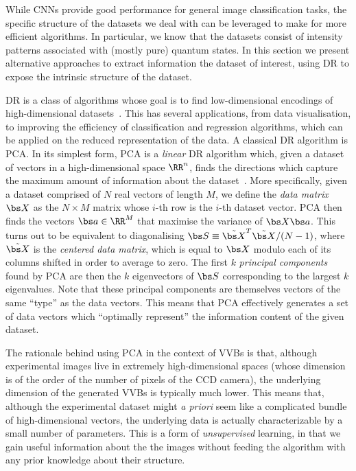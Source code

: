 While CNNs provide good performance for general image classification tasks, the specific structure of the datasets we deal with can be leveraged to make for more efficient algorithms. In particular, we know that the datasets consist of intensity patterns associated with (mostly pure) quantum states.
In this section we present alternative approaches to extract information the dataset of interest, using \ac{DR} to expose the intrinsic structure of the dataset.


\acf{DR} is a class of algorithms whose goal is to find low-dimensional encodings of high-dimensional datasets~\cite{cunningham2008dimension,fodor2002survey}.
This has several applications, from data visualisation, to improving the efficiency of classification and regression algorithms, which can be applied on the reduced representation of the data.
A classical \ac{DR} algorithm is \acf{PCA}.
In its simplest form, \ac{PCA} is a \emph{linear} \ac{DR} algorithm which, given a dataset of vectors in a high-dimensional space $\RR^n$, finds the directions which capture the maximum amount of information about the dataset~\cite{jolliffe2011principal,jolliffe2016principal}.
More specifically, given a dataset comprised of $N$ real vectors of length $M$, we define the \emph{data matrix} $\bs X$ as the $N\times M$ matrix whose $i$-th row is the $i$-th dataset vector. \ac{PCA} then finds the vectors $\bs a\in\RR^{M}$ that maximise the variance of $\bs X\bs a$. This turns out to be equivalent to diagonalising $\bs S\equiv \tilde{\bs X}^T\tilde{\bs X}/(N-1)$, where $\tilde{\bs X}$ is the \emph{centered data matrix}, which is equal to $\bs X$ modulo each of its columns shifted in order to average to zero.
The first $k$ \emph{principal components} found by \ac{PCA} are then the $k$ eigenvectors of $\bs S$ corresponding to the largest $k$ eigenvalues.
Note that these principal components are themselves vectors of the same ``type'' as the data vectors. This means that \ac{PCA} effectively generates a set of data vectors which ``optimally represent'' the information content of the given dataset.

The rationale behind using \ac{PCA} in the context of \acp{VVB} is that, although experimental images live in extremely high-dimensional spaces (whose dimension is of the order of the number of pixels of the \ac{CCD} camera), the underlying dimension of the generated \acp{VVB} is typically much lower.
This means that, although the experimental dataset might \emph{a priori} seem like a complicated bundle of high-dimensional vectors, the underlying data is actually characterizable by a small number of parameters.
This is a form of \emph{unsupervised} learning, in that we gain useful information about the the images without feeding the algorithm with any prior knowledge about their structure.


